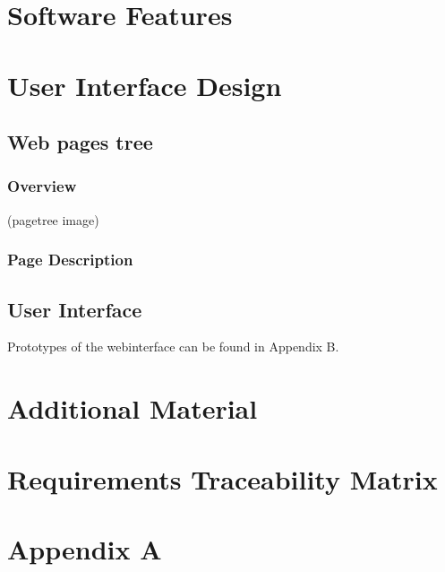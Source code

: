 \documentclass[a4paper, 12pt]{report}
\begin{document}
\pagebreak
\chapter{Software Features}




\pagebreak
\chapter{User Interface Design \label{UI Design}}
\section{Web pages tree}
\subsection{Overview}
(pagetree image)

\subsection{Page Description}

\pagebreak
\section{User Interface}
Prototypes of the webinterface can be found in Appendix B.


\chapter{Additional Material \label{Additional}}
\chapter{Requirements Traceability Matrix}

\chapter{Appendix A}
\end{document}
